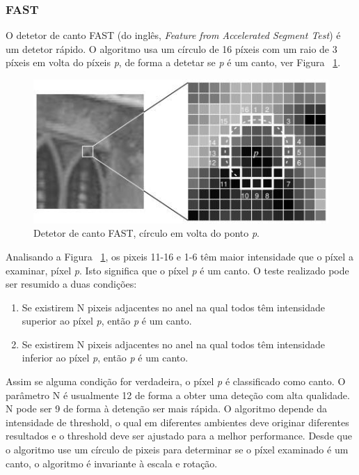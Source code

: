 \subsubsection{FAST}\label{fastsection}

O detetor de canto FAST (do inglês,\textit{ Feature from Accelerated Segment Test}) é um detetor rápido. O algoritmo usa um círculo de 16 píxeis com um raio de 3 píxeis em volta do píxeis \textit{p}, de forma a detetar se \textit{p} é um canto, ver Figura ~\ref{fig:fastcornerdetector}.

\begin{figure}[h!]
	\centering
	\includegraphics[width=0.7\linewidth]{figures/FASTcornerdetector}
	\caption{Detetor de canto FAST, círculo em volta do ponto \textit{p}. \cite{VisualOdometryRodasVehicles}}
	\label{fig:fastcornerdetector}
\end{figure}

Analisando a Figura  ~\ref{fig:fastcornerdetector}, os pixeis 11-16 e 1-6 têm maior intensidade que o píxel a examinar, píxel \textit{p}. Isto significa que o píxel \textit{p} é um canto. O teste realizado pode ser resumido a duas condições:
\begin{enumerate}
	\item Se existirem N pixeis adjacentes no anel na qual todos têm intensidade superior ao píxel \textit{p}, então \textit{p} é um canto.
	\item Se existirem N pixeis adjacentes no anel na qual todos têm intensidade inferior ao píxel \textit{p}, então \textit{p} é um canto.	
\end{enumerate}
Assim se alguma condição for verdadeira, o píxel \textit{p} é classificado como canto. O parâmetro N é usualmente 12 de forma a obter uma deteção com alta qualidade. N pode ser 9 de forma à detenção ser mais rápida. 
O algoritmo depende da intensidade de threshold, o qual em diferentes ambientes deve originar diferentes resultados e o threshold deve ser ajustado para a melhor performance. Desde que o algoritmo use um círculo de pixeis para determinar se o píxel examinado é um canto, o algoritmo é invariante à escala e rotação.


